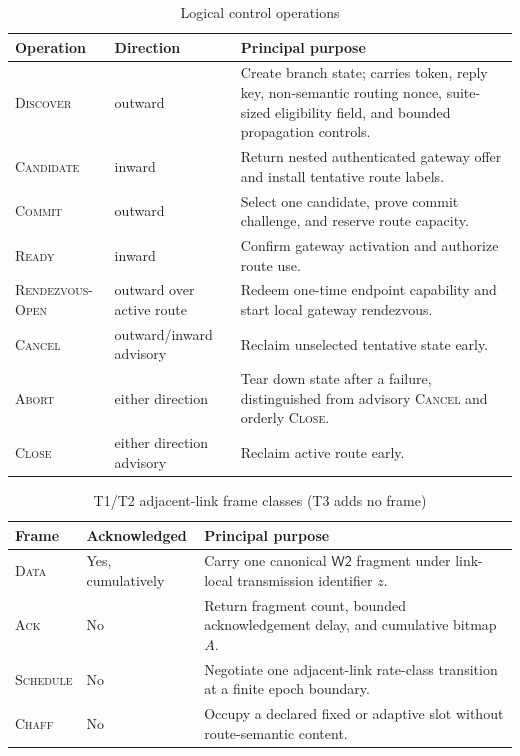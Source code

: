 \documentclass[11pt,oneside]{article}
\newcommand{\Wtwo}{\ensuremath{\mathsf{W2}}}
\begin{document}
\begin{table}[ht]
\centering
\caption{Logical control operations}
\label{tab:messageclasses}
\begin{tabularx}{\textwidth}{@{}p{}p{}X@{}}
\toprule
Operation & Direction & Principal purpose \\
\midrule
\textsc{Discover} & outward & Create branch state; carries token, reply key, non-semantic routing nonce, suite-sized eligibility field, and bounded propagation controls. \\
\textsc{Candidate} & inward & Return nested authenticated gateway offer and install tentative route labels. \\
\textsc{Commit} & outward & Select one candidate, prove commit challenge, and reserve route capacity. \\
\textsc{Ready} & inward & Confirm gateway activation and authorize route use. \\
\textsc{Rendezvous-Open} & outward over active route & Redeem one-time endpoint capability and start local gateway rendezvous. \\
\textsc{Cancel} & outward/inward advisory & Reclaim unselected tentative state early. \\
\textsc{Abort} & either direction & Tear down state after a failure, distinguished from advisory \textsc{Cancel} and orderly \textsc{Close}. \\
\textsc{Close} & either direction advisory & Reclaim active route early. \\
\bottomrule
\end{tabularx}
\end{table}

\begin{table}[ht]
\centering
\caption{T1/T2 adjacent-link frame classes (T3 adds no frame)}
\label{tab:t1frames}
\begin{tabularx}{\textwidth}{@{}p{}p{}X@{}}
\toprule
Frame & Acknowledged & Principal purpose \\
\midrule
\textsc{Data} & Yes, cumulatively & Carry one canonical \Wtwo{} fragment under link-local transmission identifier $z$. \\
\textsc{Ack} & No & Return fragment count, bounded acknowledgement delay, and cumulative bitmap $A$. \\
\textsc{Schedule} & No & Negotiate one adjacent-link rate-class transition at a finite epoch boundary. \\
\textsc{Chaff} & No & Occupy a declared fixed or adaptive slot without route-semantic content. \\
\bottomrule
\end{tabularx}
\end{table}
\end{document}
